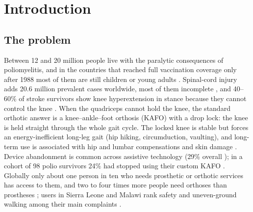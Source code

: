 \documentclass[11pt,a4paper]{article}
\begin{document}
\section{Introduction}
\subsection{The problem}
Between 12 and 20 million people live with the paralytic consequences of poliomyelitis, and in the countries that reached full vaccination coverage only after 1988 most of them are still children or young adults \cite{gonzalez2010,groce2014}. Spinal-cord injury adds 20.6 million prevalent cases worldwide, most of them incomplete \cite{gbdsci2023}, and 40--60\% of stroke survivors show knee hyperextension in stance because they cannot control the knee \cite{cooper2012}. When the quadriceps cannot hold the knee, the standard orthotic answer is a knee--ankle--foot orthosis (KAFO) with a drop lock: the knee is held straight through the whole gait cycle. The locked knee is stable but forces an energy-inefficient long-leg gait (hip hiking, circumduction, vaulting), and long-term use is associated with hip and lumbar compensations and skin damage \cite{locked_kafo_iatrogenic2023,yakimovich2009}. Device abandonment is common across assistive technology (29\% overall \cite{phillips1993}); in a cohort of 98 polio survivors 24\% had stopped using their custom KAFO \cite{jrm2021_kafo_polio}. Globally only about one person in ten who needs prosthetic or orthotic services has access to them, and two to four times more people need orthoses than prostheses \cite{who_ispo2017,ispo_pando_day}; users in Sierra Leone and Malawi rank safety and uneven-ground walking among their main complaints \cite{magnusson2017}.
\end{document}
